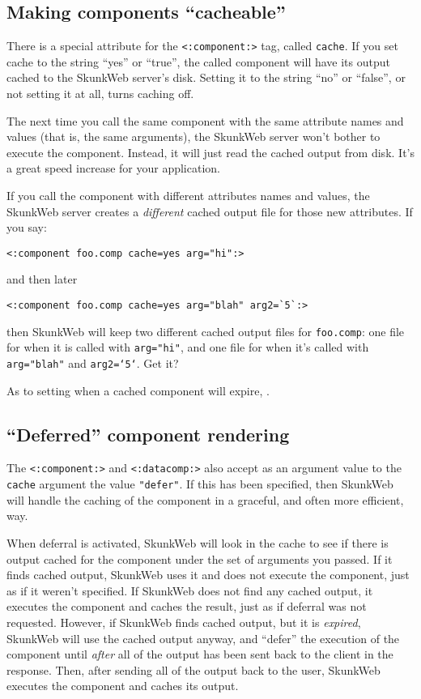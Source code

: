 \documentclass{manual}
\begin{document}
{{\subsection{Making components ``cacheable''}
\label{tagcomponentcaching}

There is a special attribute for the \texttt{<:component:>} 
tag, called \texttt{cache}. If you set cache to the string ``yes''
or ``true'', the called component will have its output cached 
to the SkunkWeb server's disk. Setting it to the string ``no'' or
``false'', or not setting it at all, turns caching off.

The next time you call the same component with the same attribute
names and values (that is, the same arguments), the SkunkWeb server
won't bother to execute the component. Instead, it will just read the
cached output from disk. It's a great speed increase for your
application.

If you call the component with different attributes names and values,
the SkunkWeb server creates a \emph{different} cached output file for
those new attributes. If you say:

\begin{verbatim}<:component foo.comp cache=yes arg="hi":>
\end{verbatim}

and then later

\begin{verbatim}<:component foo.comp cache=yes arg="blah" arg2=`5`:>
\end{verbatim}

then SkunkWeb will keep two different cached output files 
for \texttt{foo.comp}: one file for when it
is called with \texttt{arg="hi"}, and one file for when 
it's called with \texttt{arg="blah"} and \texttt{arg2=`5`}. Get it?

As to setting when a cached component will expire, .

\subsection{``Deferred'' component rendering}

The \texttt{<:component:>} and \texttt{<:datacomp:>} also accept as an
argument value to the \texttt{cache} argument the value
\texttt{"defer"}.  If this has been specified, then SkunkWeb will
handle the caching of the component in a graceful, and often more
efficient, way.

When deferral is activated, SkunkWeb will look in the cache to see if
there is output cached for the component under the set of arguments
you passed. If it finds cached output, SkunkWeb uses it and does not
execute the component, just as if it weren't specified.  If SkunkWeb
does not find any cached output, it executes the component and caches
the result, just as if deferral was not requested. However, if
SkunkWeb finds cached output, but it is \emph{expired}, SkunkWeb will
use the cached output anyway, and ``defer'' the execution of the
component until \emph{after} all of the output has been sent back to
the client in the response.  Then, after sending all of the output
back to the user, SkunkWeb executes the component and caches its
output.

}}
\end{document}
